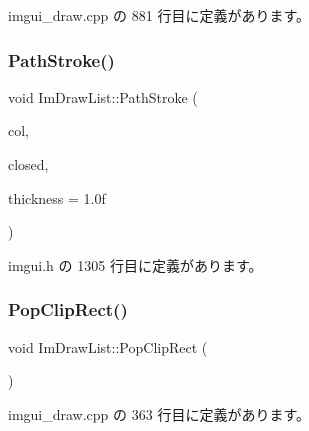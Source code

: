  imgui\+\_\+draw.\+cpp の 881 行目に定義があります。

\mbox{\label{struct_im_draw_list_ac3172e376a4b77915bb22b6d8092b8b2}} 
\subsubsection{\texorpdfstring{Path\+Stroke()}{PathStroke()}}
{\footnotesize\ttfamily void Im\+Draw\+List\+::\+Path\+Stroke (\begin{DoxyParamCaption}\item[{\mbox{\hyperlink{imgui_8h_a118cff4eeb8d00e7d07ce3d6460eed36}{Im\+U32}}}]{col,  }\item[{bool}]{closed,  }\item[{float}]{thickness = {\ttfamily 1.0f} }\end{DoxyParamCaption})\hspace{0.3cm}{\ttfamily [inline]}}



 imgui.\+h の 1305 行目に定義があります。

\mbox{\label{struct_im_draw_list_a44f40c59ca755f559020f5a7fa81103a}} 
\subsubsection{\texorpdfstring{Pop\+Clip\+Rect()}{PopClipRect()}}
{\footnotesize\ttfamily void Im\+Draw\+List\+::\+Pop\+Clip\+Rect (\begin{DoxyParamCaption}{ }\end{DoxyParamCaption})}



 imgui\+\_\+draw.\+cpp の 363 行目に定義があります。

